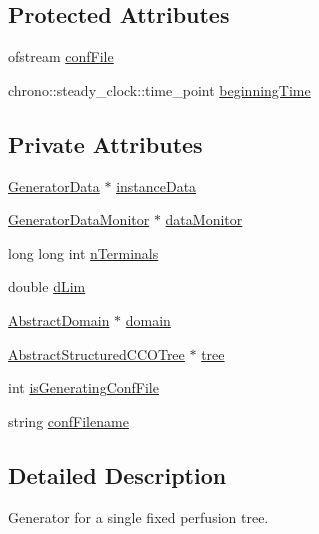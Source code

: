 \subsection*{Protected Attributes}
\begin{DoxyCompactItemize}
\item 
ofstream \hyperlink{class_f_r_r_s_tree_generator_abf91a61b2c3bfe74aa0d133796fc0aae}{conf\+File}
\item 
chrono\+::steady\+\_\+clock\+::time\+\_\+point \hyperlink{class_f_r_r_s_tree_generator_a3ee12afb75c0da076ff9f7a6a2755760}{beginning\+Time}
\end{DoxyCompactItemize}
\subsection*{Private Attributes}
\begin{DoxyCompactItemize}
\item 
\hyperlink{class_generator_data}{Generator\+Data} $\ast$ \hyperlink{class_f_r_r_s_tree_generator_a7e68f9ebd5171fbdc79d8ebac7ccc61c}{instance\+Data}
\item 
\hyperlink{class_generator_data_monitor}{Generator\+Data\+Monitor} $\ast$ \hyperlink{class_f_r_r_s_tree_generator_a8a6b326c69ca8feeee284ecdf741df00}{data\+Monitor}
\item 
long long int \hyperlink{class_f_r_r_s_tree_generator_a90d76e26de1b890e167ac570286b7615}{n\+Terminals}
\item 
double \hyperlink{class_f_r_r_s_tree_generator_afd3e174612083f26557c69374a4aabd9}{d\+Lim}
\item 
\hyperlink{class_abstract_domain}{Abstract\+Domain} $\ast$ \hyperlink{class_f_r_r_s_tree_generator_a0322f396324a87545b29a7abce226ba6}{domain}
\item 
\hyperlink{class_abstract_structured_c_c_o_tree}{Abstract\+Structured\+C\+C\+O\+Tree} $\ast$ \hyperlink{class_f_r_r_s_tree_generator_a9ff03e7c286d96e19d2fa658d167f519}{tree}
\item 
int \hyperlink{class_f_r_r_s_tree_generator_a6fc7001478ea0ce3c7ea4df930239221}{is\+Generating\+Conf\+File}
\item 
string \hyperlink{class_f_r_r_s_tree_generator_a5223ff3d634e30abe72a9156f364fce2}{conf\+Filename}
\end{DoxyCompactItemize}


\subsection{Detailed Description}
Generator for a single fixed perfusion tree. 

